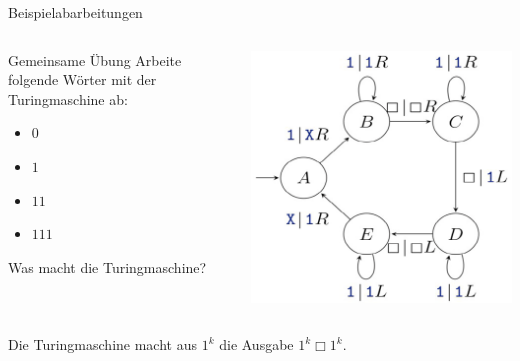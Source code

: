 \documentclass{beamer}
\begin{document}
\begin{frame}{Beispielabarbeitungen}
	\begin{columns}
		\begin{column}{0.5\textwidth}
			\begin{taskblock}{Gemeinsame Übung}
				Arbeite folgende Wörter mit der Turingmaschine ab:
				\begin{itemize}
					\item $0$
					\item $1$
					\item $11$
					\item $111$
				\end{itemize}
				Was macht die Turingmaschine?
			\end{taskblock}
		\end{column}
	
		\begin{column}{0.5\textwidth}
			\includegraphics[scale=0.4]{images/turingmaschine_1k.png}
		\end{column}
	\end{columns}

	\pause
	
	Die Turingmaschine macht aus $1^k$ die Ausgabe $1^k \Box 1^k$.
\end{frame}
\end{document}
